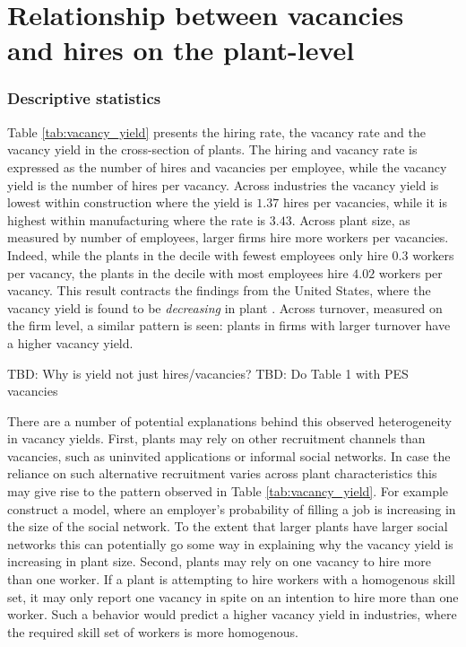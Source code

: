 \section{Relationship between vacancies and hires on the plant-level}
\label{sec:basic_rel}

\subsubsection{Descriptive statistics}



Table \ref{tab:vacancy_yield} presents the hiring rate, the vacancy rate and the vacancy yield in the cross-section of plants. The hiring and vacancy rate is expressed as the number of hires and vacancies per employee, while the vacancy yield is the number of hires per vacancy. Across industries the vacancy yield is lowest within construction where the yield is $1.37$ hires per vacancies, while it is highest within manufacturing where the rate is $3.43$. Across plant size, as measured by number of employees, larger firms hire more workers per vacancies. Indeed, while the plants in the decile with fewest employees only hire $0.3$ workers per vacancy, the plants in the decile with most employees hire $4.02$ workers per vacancy. This result contracts the findings from the United States, where the vacancy yield is found to be \emph{decreasing} in plant \citep{Moscarini2016, Davis2013}. Across turnover, measured on the firm level, a similar pattern is seen: plants in firms with larger turnover have a higher vacancy yield.

TBD: Why is yield not just hires/vacancies?
TBD: Do Table 1 with PES vacancies

There are a number of potential explanations behind this observed heterogeneity in vacancy yields. First, plants may rely on other recruitment channels than vacancies, such as uninvited applications or informal social networks. In case the reliance on such alternative recruitment varies across plant characteristics this may give rise to the pattern observed in Table \ref{tab:vacancy_yield}. For example \cite{Cahuc2009} construct a model, where an employer's probability of filling a job is increasing in the size of the social network. To the extent that larger plants have larger social networks this can potentially go some way in explaining why the vacancy yield is increasing in plant size. Second, plants may rely on one vacancy to hire more than one worker. If a plant is attempting to hire workers with a homogenous skill set, it may only report one vacancy in spite on an intention to hire more than one worker. Such a behavior would predict a higher vacancy yield in industries, where the required skill set of workers is more homogenous.

